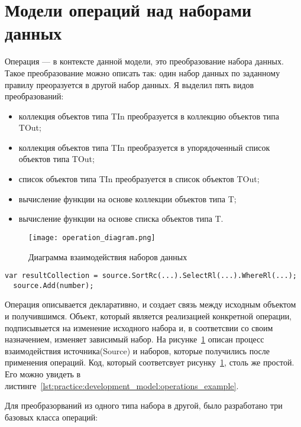 \section{Модели операций над наборами данных}
\label{sub:research:operational_model}

Операция --- в контексте данной модели, это преобразование набора данных. Такое преобразование можно описать так: один набор данных по заданному правилу преоразуется в другой набор данных.
Я выделил пять видов преобразований:

\begin{itemize}
  \item коллекция объектов типа TIn преобразуется в коллекцию объектов типа TOut;
  \item коллекция объектов типа TIn преобразуется в упорядоченный список объектов типа TOut;
  \item список объектов типа TIn преобразуется в список объектов TOut;
  \item вычисление функции на основе коллекции объектов типа T;
  \item вычисление функции на основе списка объектов типа T.
\end{itemize}

\begin{figure}[ht]
\centering
  \texttt{[image: operation\_diagram.png]}
  \caption{ Диаграмма взаимодействия наборов данных }
  \label{fig:operation_diagram}
\end{figure}

\begin{lstlisting}[style=csharpinlinestyle, caption={Пример применения операций}, label=lst:practice:development_model:operations_example]
  var resultCollection = source.SortRc(...).SelectRl(...).WhereRl(...);
  source.Add(number);
\end{lstlisting}

Операция описывается декларативно, и создает связь между исходным объектом и получившимся. Объект, который является реализацией конкретной операции, подписывыется на изменение исходного набора и, в соответсвии
со своим назначением, изменяет зависимый набор. На рисунке~\ref{fig:operation_diagram} описан процесс взаимодействия источника(Source) и наборов, которые получились после применения операций.
Код, который соответсвует рисунку~\ref{fig:operation_diagram}, столь же простой. Его можно увидеть в листинге~\ref{lst:practice:development_model:operations_example}.

Для преобразорваний из одного типа набора в другой, было разработано три базовых класса операций:

